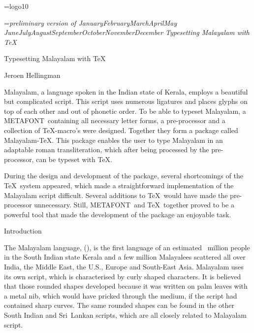 



\def\q{\hfill\quad}
\def\os{\oldstyle}
\font\logo=logo10
\def\MF{{\logo METAFONT}}
\parindent=0pt

\def\today{\number\day\space\ifcase\month\or January\or February\or March\or April\or May\or
        June\or July\or August\or September\or October\or November\or December\fi
        \space\number\year}

\headline={{\it preliminary version of \today \hfil Typesetting Malayalam with \TeX}}


\centerline{\twelvebf Typesetting Malayalam with \TeX}\bigskip
\centerline{Jeroen Hellingman}\bigskip

{\narrower
{}\medskip

\noindent Malayalam, a language spoken in the Indian state of Kerala,
employs a beautiful but complicated script. This script uses numerous
ligatures and places glyphs on top of each other and out of phonetic
order. To be able to typeset Malayalam, a \MF\ containing all
necessary letter forms, a pre-processor and a collection of
\TeX-macro's were designed. Together they form a package called
Malayalam-\TeX. This package enables the user to type Malayalam in an
adaptable roman transliteration, which after being processed by the
pre-processor, can be typeset with \TeX.

During the design and development of the package, several shortcomings
of the \TeX\ system appeared, which made a straightforward
implementation of the Malayalam script difficult. Several additions to
\TeX\ would have made the pre-processor unnecessary. Still, \MF\ and
\TeX\ together proved to be a powerful tool that made the development
of the package an enjoyable task.\par}

\beginsection Introduction

The Malayalam language, ({\mm {}}), is the first language of
an estimated {\os30}~million people in the South Indian state Kerala and 
a few million Malayalees scattered all over India, the Middle East, the U.S.,
Europe and South-East Asia. Malayalam
uses its own script, which is characterised by curly shaped
characters. It is believed that those rounded shapes developed because
it was written on palm leaves with a metal nib, which would have
pricked through the medium, if the script had contained sharp curves.
The same rounded shapes can be found in the other South Indian and
Sri~Lankan scripts, which are all closely related to Malayalam script.

